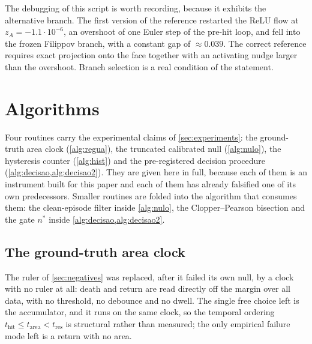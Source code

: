 \documentclass[11pt]{article}
\theoremstyle{definition}
\theoremstyle{remark}
\newcommand{\thit}{t_{\mathrm{hit}}}
\begin{document}
The debugging of this script is worth recording, because it exhibits the
alternative branch. The first version of the reference restarted the ReLU flow at
$z_A=-1.1\cdot10^{-6}$, an overshoot of one Euler step of the pre-hit loop, and
fell into the frozen Filippov branch, with a constant gap of $\approx0.039$. The
correct reference requires exact projection onto the face together with an
activating nudge larger than the overshoot. Branch selection is a real condition
of the statement.

\section{Algorithms}\label{app:algorithms}

Four routines carry the experimental claims of \cref{sec:experiments}: the
ground-truth area clock (\cref{alg:regua}), the truncated calibrated null
(\cref{alg:nulo}), the hysteresis counter (\cref{alg:hist}) and the
pre-registered decision procedure (\cref{alg:decisao,alg:decisao2}). They are
given here in
full, because each of them is an instrument built for this paper and each of them
has already falsified one of its own predecessors. Smaller routines are folded
into the algorithm that consumes them: the clean-episode filter inside
\cref{alg:nulo}, the Clopper--Pearson bisection and the gate $n^\ast$ inside
\cref{alg:decisao,alg:decisao2}.

\subsection{The ground-truth area clock}\label{app:alg1}

The ruler of \cref{sec:negatives} was replaced, after it failed its own null, by
a clock with no ruler at all: death and return are read directly off the margin
over all data, with no threshold, no debounce and no dwell. The single free
choice left is the accumulator, and it runs on the same clock, so the temporal
ordering $\thit\le t_{\mathrm{area}}<t_{\mathrm{res}}$ is structural rather than
measured; the only empirical failure mode left is a return with no area.
\end{document}
